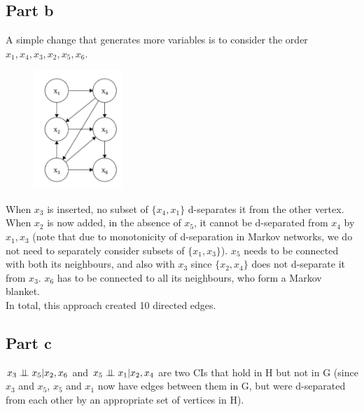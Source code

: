 \subsection{Part b}
A simple change that generates more variables is to consider the order $x_1, x_4, x_3, x_2, x_5, x_6$.
\begin{figure}[H]
    \centering
    \includegraphics[width=0.3\textwidth]{../images/BN_Q9_2.png}
\end{figure}
When $x_3$ is inserted, no subset of $\{x_4, x_1\}$ d-separates it from the other vertex. When $x_2$ is now added, in the absence of $x_5$, it cannot be d-separated from $x_4$ by $x_1, x_3$ (note that due to monotonicity of d-separation in Markov networks, we do not need to separately consider subsets of $\{x_1, x_3\}$). $x_5$ needs to be connected with both its neighbours, and also with $x_3$ since $\{x_2, x_4\}$ does not d-separate it from $x_3$. $x_6$ has to be connected to all its neighbours, who form a Markov blanket.\\
In total, this approach created 10 directed edges.

\subsection{Part c}
$x_3 \perp\mkern-9.5mu\perp x_5 | x_2, x_6$ and $x_5 \perp\mkern-9.5mu\perp x_1 | x_2, x_4$ are two CIs that hold in H but not in G (since $x_3$ and $x_5$, $x_5$ and $x_1$ now have edges between them in G, but were d-separated from each other by an appropriate set of vertices in H).\\
